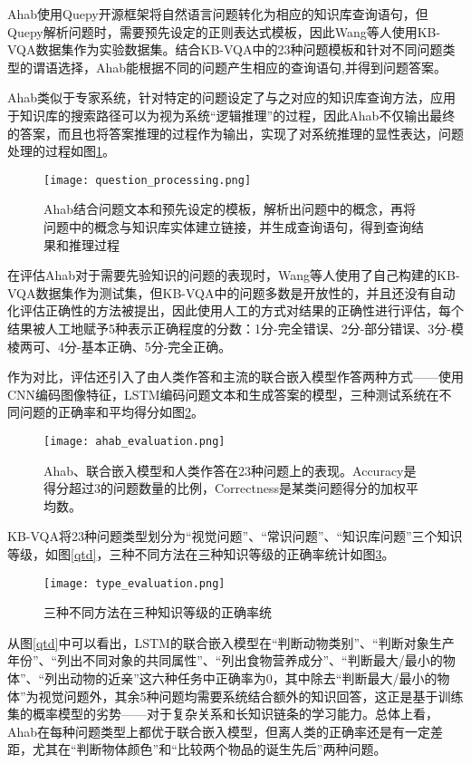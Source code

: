 Ahab使用Quepy开源框架将自然语言问题转化为相应的知识库查询语句，但Quepy解析问题时，需要预先设定的正则表达式模板，因此Wang等人使用KB-VQA数据集作为实验数据集。结合KB-VQA中的23种问题模板和针对不同问题类型的谓语选择，Ahab能根据不同的问题产生相应的查询语句,并得到问题答案。

Ahab类似于专家系统，针对特定的问题设定了与之对应的知识库查询方法，应用于知识库的搜索路径可以为视为系统“逻辑推理”的过程，因此Ahab不仅输出最终的答案，而且也将答案推理的过程作为输出，实现了对系统推理的显性表达，问题处理的过程如图\ref{question_processing}。
\begin{figure}[H]
	\centering
	\texttt{[image: question\_processing.png]}
	\caption{Ahab结合问题文本和预先设定的模板，解析出问题中的概念，再将问题中的概念与知识库实体建立链接，并生成查询语句，得到查询结果和推理过程}
	\label{question_processing}
\end{figure}

在评估Ahab对于需要先验知识的问题的表现时，Wang等人使用了自己构建的KB-VQA数据集作为测试集，但KB-VQA中的问题多数是开放性的，并且还没有自动化评估正确性的方法被提出，因此使用人工的方式对结果的正确性进行评估，每个结果被人工地赋予5种表示正确程度的分数：1分-完全错误、2分-部分错误、3分-模棱两可、4分-基本正确、5分-完全正确。

作为对比，评估还引入了由人类作答和主流的联合嵌入模型作答两种方式——使用CNN编码图像特征，LSTM编码问题文本和生成答案的模型，三种测试系统在不同问题的正确率和平均得分如图\ref{ahab_evaluation}。
\begin{figure}[H]
	\centering
	\texttt{[image: ahab\_evaluation.png]}
	\caption{Ahab、联合嵌入模型和人类作答在23种问题上的表现。Accuracy是得分超过3的问题数量的比例，Correctness是某类问题得分的加权平均数。}
	\label{ahab_evaluation}
\end{figure}
KB-VQA将23种问题类型划分为“视觉问题”、“常识问题”、“知识库问题”三个知识等级，如图\ref{qtd}，三种不同方法在三种知识等级的正确率统计如图\ref{type_evaluation}。
\begin{figure}[H]
	\centering
	\texttt{[image: type\_evaluation.png]}
	\caption{三种不同方法在三种知识等级的正确率统}
	\label{type_evaluation}
\end{figure}

从图\ref{qtd}中可以看出，LSTM的联合嵌入模型在“判断动物类别”、“判断对象生产年份”、“列出不同对象的共同属性”、“列出食物营养成分”、“判断最大/最小的物体”、“列出动物的近亲”这六种任务中正确率为0，其中除去“判断最大/最小的物体”为视觉问题外，其余5种问题均需要系统结合额外的知识回答，这正是基于训练集的概率模型的劣势——对于复杂关系和长知识链条的学习能力。总体上看，Ahab在每种问题类型上都优于联合嵌入模型，但离人类的正确率还是有一定差距，尤其在“判断物体颜色”和“比较两个物品的诞生先后”两种问题。

